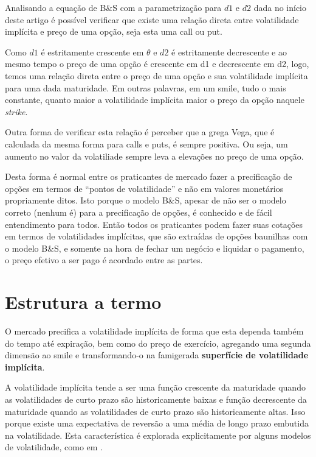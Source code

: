 \documentclass[]{book}
\theoremstyle{definition}
\theoremstyle{definition}
\theoremstyle{definition}
\theoremstyle{remark}
\begin{document}
Analisando a equação de B\&S com a parametrização para \(d1\) e \(d2\) dada no início deste artigo é possível verificar que existe uma relação direta entre volatilidade implícita e preço de uma opção, seja esta uma call ou put.

Como \(d1\) é estritamente crescente em \(\theta\) e \(d2\) é estritamente decrescente e ao mesmo tempo o preço de uma opção é crescente em d1 e decrescente em d2, logo, temos uma relação direta entre o preço de uma opção e sua volatilidade implícita para uma dada maturidade. Em outras palavras, em um smile, tudo o mais constante, quanto maior a volatilidade implícita maior o preço da opção naquele \emph{strike}.

Outra forma de verificar esta relação é perceber que a grega Vega, que é calculada da mesma forma para calls e puts, é sempre positiva. Ou seja, um aumento no valor da volatiliade sempre leva a elevações no preço de uma opção.

Desta forma é normal entre os praticantes de mercado fazer a precificação de opções em termos de ``pontos de volatilidade'' e não em valores monetários propriamente ditos. Isto porque o modelo B\&S, apesar de não ser o modelo correto (nenhum é) para a precificação de opções, é conhecido e de fácil entendimento para todos. Então todos os praticantes podem fazer suas cotações em termos de volatilidades implícitas, que são extraídas de opções baunilhas com o modelo B\&S, e somente na hora de fechar um negócio e liquidar o pagamento, o preço efetivo a ser pago é acordado entre as partes.

\hypertarget{estrutura-a-termo}{%
\section{Estrutura a termo}\label{estrutura-a-termo}}

O mercado precifica a volatilidade implícita de forma que esta dependa também do tempo até expiração, bem como do preço de exercício, agregando uma segunda dimensão ao smile e transformando-o na famigerada \textbf{superfície de volatilidade implícita}.

A volatilidade implícita tende a ser uma função crescente da maturidade quando as volatilidades de curto prazo são historicamente baixas e função decrescente da maturidade quando as volatilidades de curto prazo são historicamente altas. Isso porque existe uma expectativa de reversão a uma média de longo prazo embutida na volatilidade. Esta característica é explorada explicitamente por alguns modelos de volatilidade, como em \citet{Heston1993}.
\end{document}
